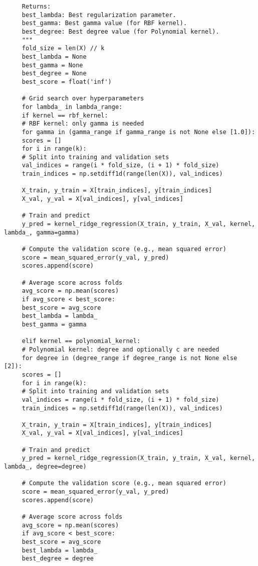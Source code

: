 \documentclass[letterpaper]{article}
\begin{document}
\begin{lstlisting}
     Returns:
     best_lambda: Best regularization parameter.
     best_gamma: Best gamma value (for RBF kernel).
     best_degree: Best degree value (for Polynomial kernel).
     """
     fold_size = len(X) // k
     best_lambda = None
     best_gamma = None
     best_degree = None
     best_score = float('inf')
     
     # Grid search over hyperparameters
     for lambda_ in lambda_range:
     if kernel == rbf_kernel:
     # RBF kernel: only gamma is needed
     for gamma in (gamma_range if gamma_range is not None else [1.0]):
     scores = []
     for i in range(k):
     # Split into training and validation sets
     val_indices = range(i * fold_size, (i + 1) * fold_size)
     train_indices = np.setdiff1d(range(len(X)), val_indices)
     
     X_train, y_train = X[train_indices], y[train_indices]
     X_val, y_val = X[val_indices], y[val_indices]
     
     # Train and predict
     y_pred = kernel_ridge_regression(X_train, y_train, X_val, kernel, lambda_, gamma=gamma)
     
     # Compute the validation score (e.g., mean squared error)
     score = mean_squared_error(y_val, y_pred)
     scores.append(score)
     
     # Average score across folds
     avg_score = np.mean(scores)
     if avg_score < best_score:
     best_score = avg_score
     best_lambda = lambda_
     best_gamma = gamma
     
     elif kernel == polynomial_kernel:
     # Polynomial kernel: degree and optionally c are needed
     for degree in (degree_range if degree_range is not None else [2]):
     scores = []
     for i in range(k):
     # Split into training and validation sets
     val_indices = range(i * fold_size, (i + 1) * fold_size)
     train_indices = np.setdiff1d(range(len(X)), val_indices)
     
     X_train, y_train = X[train_indices], y[train_indices]
     X_val, y_val = X[val_indices], y[val_indices]
     
     # Train and predict
     y_pred = kernel_ridge_regression(X_train, y_train, X_val, kernel, lambda_, degree=degree)
     
     # Compute the validation score (e.g., mean squared error)
     score = mean_squared_error(y_val, y_pred)
     scores.append(score)
     
     # Average score across folds
     avg_score = np.mean(scores)
     if avg_score < best_score:
     best_score = avg_score
     best_lambda = lambda_
     best_degree = degree
     

\end{lstlisting}
\end{document}
